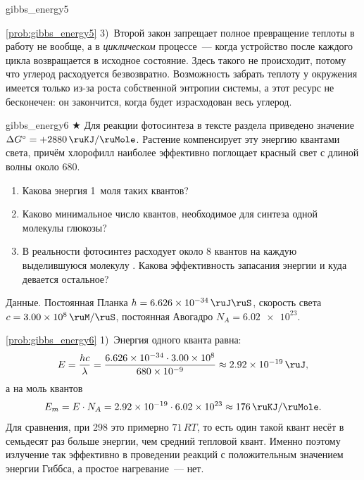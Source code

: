 \begin{problem}{}{gibbs_energy5}
\begin{sol}{\ref{prob:gibbs_energy5}}
        3)~Второй закон запрещает полное превращение теплоты в работу не вообще, а в \emph{циклическом} процессе~--- когда устройство после каждого цикла возвращается в исходное состояние. Здесь такого не происходит, потому что углерод расходуется безвозвратно. Возможность забрать теплоту у окружения имеется только из-за роста собственной энтропии системы, а этот ресурс не бесконечен: он закончится, когда будет израсходован весь углерод.
    \end{sol}
\end{problem}

\begin{problem}{}{gibbs_energy6}
    $\bigstar$ Для реакции фотосинтеза
    в тексте раздела приведено значение $\Delta G^{\circ} = +\qty{2880}{\ruKJ\per\ruMole}$. Растение компенсирует эту энергию квантами света, причём хлорофилл наиболее эффективно поглощает красный свет с длиной волны около \qty{680}{\ruNm}.

    \begin{enumerate}[label=\arabic*)]
        \item Какова энергия 1~моля таких квантов?
        \item Каково минимальное число квантов, необходимое для синтеза одной молекулы глюкозы?
        \item В реальности фотосинтез расходует около \num{8} квантов на каждую выделившуюся молекулу . Какова эффективность запасания энергии и куда девается остальное?
    \end{enumerate}

    Данные. Постоянная Планка $h = \qty{6,626e-34}{\ruJ\ruS}$, скорость света $c = \qty{3,00e8}{\ruM\per\ruS}$, постоянная Авогадро $N_A = \num{6,02e23}$.
    \begin{sol}{\ref{prob:gibbs_energy6}}
        1)~Энергия одного кванта равна:
        \begin{equation*}
            E = \frac{hc}{\lambda} = \frac{\num{6,626e-34} \cdot \num{3,00e8}}{\num{680e-9}} \approx \qty{2,92e-19}{\ruJ},
        \end{equation*}
        а на моль квантов
        \begin{equation*}
            E_m = E \cdot N_A = \num{2,92e-19} \cdot \num{6,02e23} \approx \qty{176}{\ruKJ\per\ruMole}.
        \end{equation*}
        Для сравнения, при \qty{298}{\ruK} это примерно $71\,RT$, то есть один такой квант несёт в семьдесят раз больше энергии, чем средний тепловой квант. Именно поэтому излучение так эффективно в проведении реакций с положительным значением энергии Гиббса, а простое нагревание~--- нет.


\end{sol}
\end{problem}
